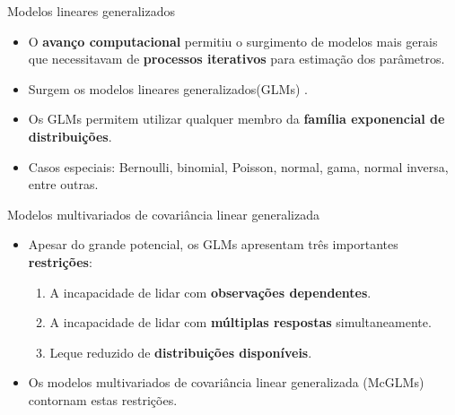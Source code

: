 \documentclass[
  ignorenonframetext,
  serif,
  professionalfont,
  usenames,
  dvipsnames,
  aspectratio = 169]{beamer}
\begin{document}
\begin{frame}{Modelos lineares generalizados}
\protect\hypertarget{modelos-lineares-generalizados}{}
\begin{itemize}
    \itemsep 2ex

  \item O \textbf{avanço computacional} permitiu o surgimento de modelos mais gerais que necessitavam de \textbf{processos iterativos} para estimação dos parâmetros. 
  
  \item Surgem os modelos lineares generalizados(GLMs) \citep{Nelder72}. 
  
  \item Os GLMs permitem utilizar qualquer membro da \textbf{família exponencial de distribuições}.

  \item Casos especiais: Bernoulli, binomial, Poisson, normal, gama, normal inversa, entre outras.
  
  \end{itemize}
\end{frame}

\begin{frame}{Modelos multivariados de covariância linear generalizada}
\protect\hypertarget{modelos-multivariados-de-covariuxe2ncia-linear-generalizada}{}
\begin{itemize}
    \itemsep 2ex
  
  \item Apesar do grande potencial, os GLMs apresentam três importantes \textbf{restrições}:
    \begin{enumerate}
      \itemsep 2ex
    
      \item A incapacidade de lidar com \textbf{observações dependentes}. 
      \item A incapacidade de lidar com \textbf{múltiplas respostas} simultaneamente.
      \item Leque reduzido de \textbf{distribuições disponíveis}. 
    \end{enumerate}

  \item Os modelos multivariados de covariância linear generalizada (McGLMs) \citep{Bonat16} contornam estas restrições.

  \end{itemize}
\end{frame}
\end{document}
